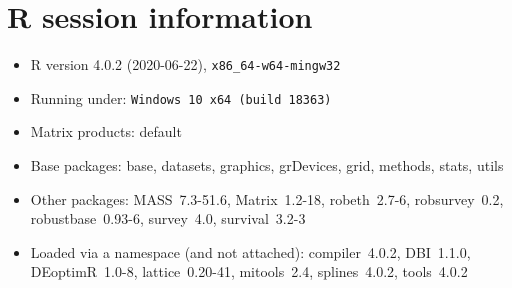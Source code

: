 \documentclass[a4paper]{scrartcl}
\begin{document}
\section{R session information}
\begin{itemize}\raggedright
  \item R version 4.0.2 (2020-06-22), \verb|x86_64-w64-mingw32|
  \item Running under: \verb|Windows 10 x64 (build 18363)|
  \item Matrix products: default
  \item Base packages: base, datasets, graphics, grDevices, grid,
    methods, stats, utils
  \item Other packages: MASS~7.3-51.6, Matrix~1.2-18, robeth~2.7-6,
    robsurvey~0.2, robustbase~0.93-6, survey~4.0, survival~3.2-3
  \item Loaded via a namespace (and not attached): compiler~4.0.2,
    DBI~1.1.0, DEoptimR~1.0-8, lattice~0.20-41, mitools~2.4,
    splines~4.0.2, tools~4.0.2
\end{itemize}
\end{document}

